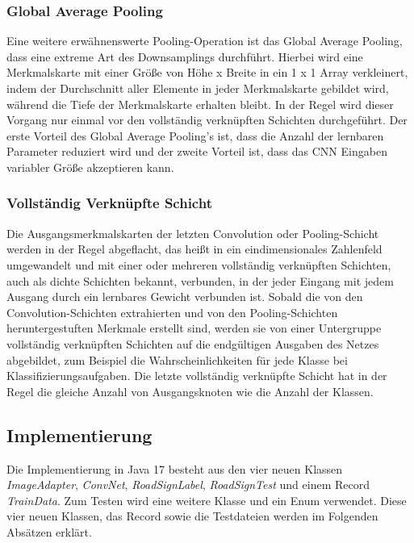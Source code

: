 \documentclass[paper=A4,pagesize=auto,12pt,headinclude=true,footinclude=true,BCOR=0mm,DIV=calc]{scrartcl}
\begin{document}
\subsubsection{Global Average Pooling}
Eine weitere erwähnenswerte Pooling-Operation ist das Global Average Pooling, dass eine extreme Art des Downsamplings durchführt. Hierbei wird eine Merkmalskarte mit einer Größe von Höhe x Breite in ein 1 x 1 Array verkleinert, indem der Durchschnitt aller Elemente in jeder Merkmalskarte gebildet wird, während die Tiefe der Merkmalskarte erhalten bleibt. In der Regel wird dieser Vorgang nur einmal vor den vollständig verknüpften Schichten durchgeführt. Der erste Vorteil des Global Average Pooling’s ist, dass die Anzahl der lernbaren Parameter reduziert wird und der zweite Vorteil ist, dass das CNN Eingaben variabler Größe akzeptieren kann.\cite{cnn2}

\subsubsection{Vollständig Verknüpfte Schicht}
Die Ausgangsmerkmalskarten der letzten Convolution oder Pooling-Schicht werden in der Regel abgeflacht, das heißt in ein eindimensionales Zahlenfeld umgewandelt und mit einer oder mehreren vollständig verknüpften Schichten, auch als dichte Schichten bekannt, verbunden, in der jeder Eingang mit jedem Ausgang durch ein lernbares Gewicht verbunden ist. Sobald die von den Convolution-Schichten extrahierten und von den Pooling-Schichten heruntergestuften Merkmale erstellt sind, werden sie von einer Untergruppe vollständig verknüpften Schichten auf die endgültigen Ausgaben des Netzes abgebildet, zum Beispiel die Wahrscheinlichkeiten für jede Klasse bei Klassifizierungsaufgaben. Die letzte vollständig verknüpfte Schicht hat in der Regel die gleiche Anzahl von Ausgangsknoten wie die Anzahl der Klassen.\cite{cnn2}

\subsection{Implementierung} %
Die Implementierung in Java 17 besteht aus den vier neuen Klassen \textit{ImageAdapter}, \textit{ConvNet}, \textit{RoadSignLabel}, \textit{RoadSignTest} und einem Record \textit{TrainData}. Zum Testen wird eine weitere Klasse und ein Enum verwendet. Diese vier neuen Klassen, das Record sowie die Testdateien werden im Folgenden Absätzen erklärt.
\end{document}

